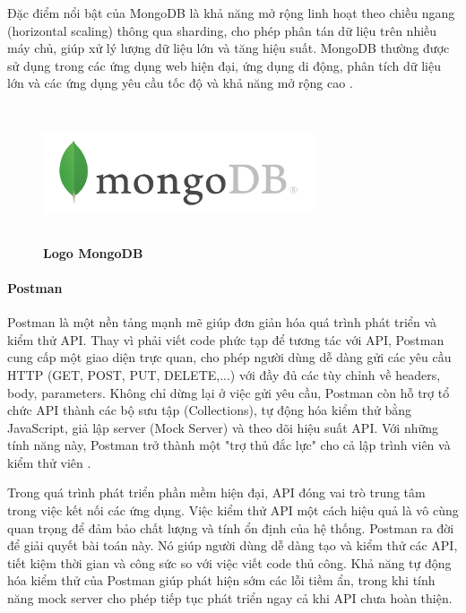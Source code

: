 Đặc điểm nổi bật của MongoDB là khả năng mở rộng linh hoạt theo chiều ngang (horizontal scaling) thông qua sharding, cho phép phân tán dữ liệu trên nhiều máy chủ, giúp xử lý lượng dữ liệu lớn và tăng hiệu suất. MongoDB thường được sử dụng trong các ứng dụng web hiện đại, ứng dụng di động, phân tích dữ liệu lớn và các ứng dụng yêu cầu tốc độ và khả năng mở rộng cao \cite{mongodb}.

\begin{figure}[H]
	\centering
	\includegraphics[width=8cm,height=4cm]{Images/Technology/mongo.png}
	\caption[Logo MongoDB]{\bfseries \fontsize{12pt}{0pt}
		\selectfont Logo MongoDB}
	\label{mongodb} %
\end{figure}

\paragraph{Postman}
\mbox{}

Postman là một nền tảng mạnh mẽ giúp đơn giản hóa quá trình phát triển và kiểm thử API. Thay vì phải viết code phức tạp để tương tác với API, Postman cung cấp một giao diện trực quan, cho phép người dùng dễ dàng gửi các yêu cầu HTTP (GET, POST, PUT, DELETE,...) với đầy đủ các tùy chỉnh về headers, body, parameters. Không chỉ dừng lại ở việc gửi yêu cầu, Postman còn hỗ trợ tổ chức API thành các bộ sưu tập (Collections), tự động hóa kiểm thử bằng JavaScript, giả lập server (Mock Server) và theo dõi hiệu suất API. Với những tính năng này, Postman trở thành một "trợ thủ đắc lực" cho cả lập trình viên và kiểm thử viên \cite{postman}.

Trong quá trình phát triển phần mềm hiện đại, API đóng vai trò trung tâm trong việc kết nối các ứng dụng. Việc kiểm thử API một cách hiệu quả là vô cùng quan trọng để đảm bảo chất lượng và tính ổn định của hệ thống. Postman ra đời để giải quyết bài toán này. Nó giúp người dùng dễ dàng tạo và kiểm thử các API, tiết kiệm thời gian và công sức so với việc viết code thủ công. Khả năng tự động hóa kiểm thử của Postman giúp phát hiện sớm các lỗi tiềm ẩn, trong khi tính năng mock server cho phép tiếp tục phát triển ngay cả khi API chưa hoàn thiện.

